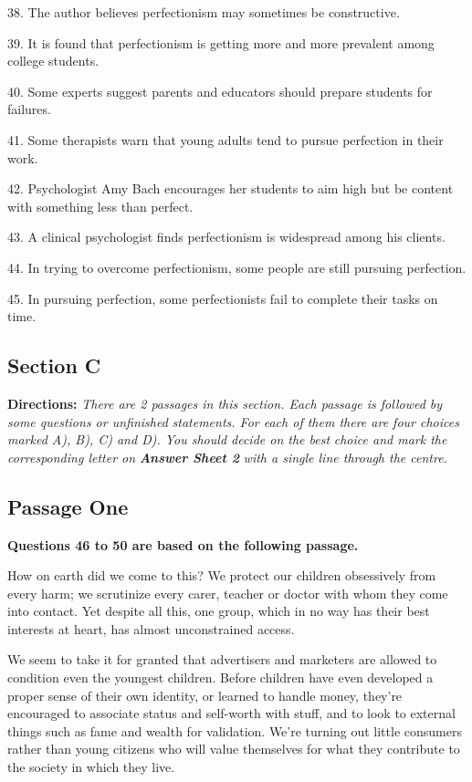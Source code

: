\documentclass[UTF8,11pt]{ctexart}
\begin{document}
38. The author believes perfectionism may sometimes be constructive.


39. It is found that perfectionism is getting more and more prevalent among college students.


40. Some experts suggest parents and educators should prepare students for failures.


41. Some therapists warn that young adults tend to pursue perfection in their work.


42. Psychologist Amy Bach encourages her students to aim high but be content with something less than perfect.


43. A clinical psychologist finds perfectionism is widespread among his clients.


44. In trying to overcome perfectionism, some people are still pursuing perfection.


45. In pursuing perfection, some perfectionists fail to complete their tasks on time.


\subsection*{\textbf{Section C}}


\textbf{Directions: }\textit{There are 2 passages in this section. Each passage is followed by some questions or unfinished} \textit{statements. For each of them there are four choices marked A), B), C) and D). You should decide on the best} \textit{choice and mark the corresponding letter on }\textbf{\textit{Answer Sheet 2}}\textit{ with a single line through the centre.}


\subsection*{\textbf{Passage One}}


\textbf{Questions 46 to 50 are based on the following passage.}


How on earth did we come to this? We protect our children obsessively from every harm; we scrutinize every carer, teacher or doctor with whom they come into contact. Yet despite all this, one group, which in no way has their best interests at heart, has almost unconstrained access.


We seem to take it for granted that advertisers and marketers are allowed to condition even the youngest children. Before children have even developed a proper sense of their own identity, or learned to handle money, they’re encouraged to associate status and self-worth with stuff, and to look to external things such as fame and wealth for validation. We’re turning out little consumers rather than young citizens who will value themselves for what they contribute to the society in which they live.
\end{document}
